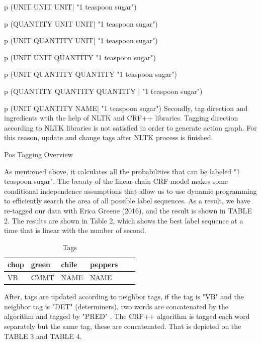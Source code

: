 p (UNIT UNIT UNIT| "1 teaspoon sugar")

p (QUANTITY UNIT UNIT| "1 teaspoon sugar")

p (UNIT QUANTITY UNIT| "1 teaspoon sugar")

p (UNIT UNIT QUANTITY "1 teaspoon sugar")

p (UNIT QUANTITY QUANTITY "1 teaspoon sugar")

p (QUANTITY QUANTITY QUANTITY | "1 teaspoon sugar")

p (UNIT QUANTITY NAME| "1 teaspoon sugar")
Secondly, tag direction and ingredients wtih the help of NLTK and CRF++ libraries. Tagging direction according to NLTK libraries is not satisfied in order to generate  action graph. For this reason, update and change tags after NLTK process is finished. 

\begin{algorithm}
\caption{Pos Tagging Overview}
\label{alg:generator}

\end{algorithm}
As mentioned above, it calculates all the probabilities that can be labeled "1 teaspoon sugar". The beauty of the linear-chain CRF model makes some conditional independence assumptions that allow us to use dynamic programming to efficiently search the area of all possible label sequences. As a result, we have re-tagged our data with Erica Greene (2016), and the result is shown in TABLE 2. The results are shown in Table 2, which shows the best label sequence at a time that is linear with the number of second.


\begin{table}[]
\centering
\caption{Tags}
\label{my-label}
\begin{tabular}{|l|l|l|l|l|l|}
\hline
chop & green & chile & peppers \\ \hline
VB     & CMMT    & NAME    & NAME      \\ \hline
\end{tabular}
\end{table}

 After, tags are updated according to neighbor tags, if the tag is "VB" and the neighbor tag is "DET" (determiners), two words are concatenated by the algorithm and tagged by "PRED" . The CRF++ algorithm is tagged each word separately but  the same tag,    these are concatenated. That is depicted on the TABLE 3 and TABLE 4. 
 
